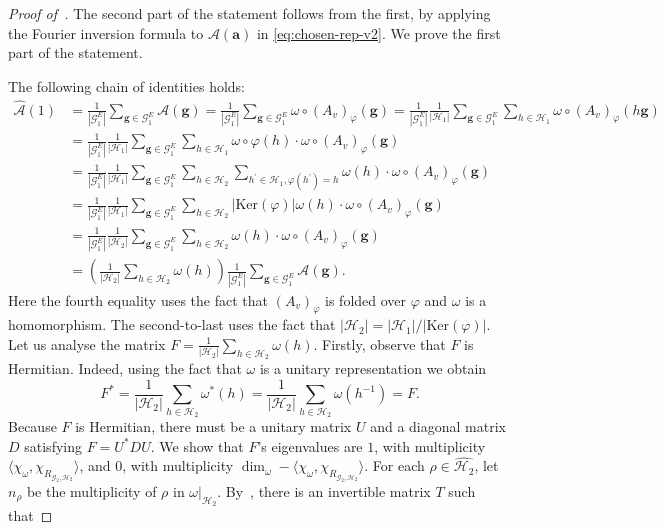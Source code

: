 \documentclass[a4paper,11pt]{article}
\theoremstyle{definition}
\newcommand{\tuple}[1]{{\mathbf{#1}}}
\newcommand{\gr}{\mathscr{G}}
\newcommand{\sgr}{\mathscr{H}}
\newcommand{\A}{\mathcal{A}}
\begin{document}
\begin{proof}[Proof of~]
    The second part of the statement follows from the first, by applying the Fourier inversion formula to $\A(\tuple{a})$ in \eqref{eq:chosen-rep-v2}. We prove the first part of the statement. \par
    The following chain of identities holds:
    \begin{align*}
    \widehat{\A}(1) & =
    \frac{1}{|\gr_1^E|}
    \sum_{\tuple{g}\in \gr_1^E}
    \A(\tuple{g}) =
    \frac{1}{|\gr_1^E|}
    \sum_{\tuple{g}\in \gr_1^E} \omega \circ (A_v)_\varphi(\tuple{g})
    =
        \frac{1}{|\gr_1^E|}
        \frac{1}{|\sgr_1|}
    \sum_{\tuple{g}\in \gr_1^E}
    \sum_{h\in \sgr_1}
    \omega \circ (A_v)_\varphi(h\tuple{g})
    \\ &=
        \frac{1}{|\gr_1^E|}
        \frac{1}{|\sgr_1|}
    \sum_{\tuple{g}\in \gr_1^E}
    \sum_{h\in \sgr_1}
    \omega \circ \varphi(h) \cdot
    \omega \circ (A_v)_\varphi(\tuple{g})
    \\ & =
    \frac{1}{|\gr_1^E|}
    \frac{1}{|\sgr_1|}
    \sum_{\tuple{g}\in \gr_1^E}
    \sum_{h\in \sgr_2}
    \sum_{h^\prime \in \sgr_1, \varphi(h^\prime)=h}
    \omega(h) \cdot
    \omega \circ (A_v)_\varphi(\tuple{g}) \\ & =
    \frac{1}{|\gr_1^E|}
    \frac{1}{|\sgr_1|}
    \sum_{\tuple{g}\in \gr_1^E}
    \sum_{h\in \sgr_2}
    |\mathrm{Ker}(\varphi)|
    \omega(h) \cdot
    \omega \circ (A_v)_\varphi(\tuple{g})
    \\ & =
    \frac{1}{|\gr_1^E|}
    \frac{1}{|\sgr_2|}
    \sum_{\tuple{g}\in \gr_1^E}
    \sum_{h\in \sgr_2}
    \omega(h) \cdot
    \omega \circ (A_v)_\varphi(\tuple{g})
     \\ & =
     \left(
         \frac{1}{|\sgr_2|}
      \sum_{h\in \sgr_2}
    \omega(h)
    \right)
    \frac{1}{|\gr_1^E|}
    \sum_{\tuple{g}\in \gr_1^E}
\A(\tuple{g}).
\end{align*}
Here the fourth equality uses the fact that $(A_v)_\varphi$ is folded over $\varphi$ and $\omega$ is a homomorphism. The second-to-last uses the fact that $|\sgr_2| =|\sgr_1|/|\mathrm{Ker}(\varphi)|$. 
    Let us analyse the matrix $F=\frac{1}{|\sgr_2|}
    \sum_{h\in \sgr_2}
    \omega(h)$.
    Firstly, observe that $F$ is Hermitian. Indeed, using the fact that $\omega$ is a unitary representation we obtain
    \[
    F^* = \frac{1}{|\sgr_2|}
    \sum_{h\in \sgr_2}
    \omega^*(h)= \frac{1}{|\sgr_2|}
    \sum_{h\in \sgr_2}
    \omega(h^{-1}) = F.    
    \]
    Because $F$ is Hermitian, there must be a unitary matrix $U$ and a diagonal matrix $D$ satisfying $F=U^* D U$. We show that $F$'s eigenvalues are $1$, with multiplicity  $\langle \chi_\omega, \chi_{R_{\gr_2,\sgr_2}} \rangle$, and $0$, with multiplicity $\dim_\omega - \langle \chi_\omega, \chi_{R_{\gr_2,\sgr_2}} \rangle$. For each $\rho \in \widehat{\sgr_2}$, let $n_\rho$ be the multiplicity of $\rho$ in $\omega\vert_{\sgr_2}$.    By~, there is an invertible matrix $T$ such that

\end{proof}
\end{document}
